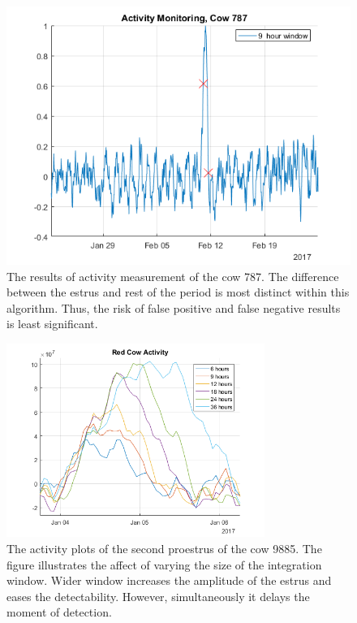 \documentclass[english,12pt,a4paper,pdftex,elec,utf8]{aaltothesis}
\begin{document}
\begin{figure}[htb]
\centering
\includegraphics[width = 0.75 \textwidth]{figures/ActivityMonitoringCow787.png}
\caption{The results of activity measurement of the cow 787. The difference between the estrus and rest of the period is most distinct within this algorithm. Thus, the risk of false positive and false negative results is least significant.}
\label{ActivityMonitoringCow787}
\end{figure}





\begin{figure}[htb]
\centering
\includegraphics[width = 0.75\textwidth]{figures/redcowactivity2.png}
\caption{The activity plots of the second proestrus of the cow 9885. The figure illustrates the affect of varying the size of the integration window. Wider window increases the amplitude of the estrus and eases the detectability. However, simultaneously it delays the moment of detection. }
\label{integrationwindows}
\end{figure}
\end{document}

